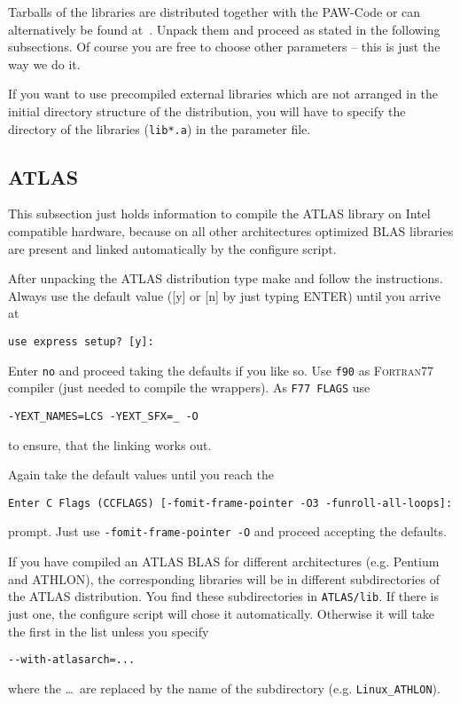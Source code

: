 \documentclass[a4paper,10pt]{article}
\newcommand{\PAW}{\textsc{PAW}}
\begin{document}
Tarballs of the libraries are distributed together with
the \PAW-Code or can alternatively be found at~\cite{mpich,atlas,fftw}.
Unpack them and proceed as stated in the following subsections.  Of course
you are free to choose other parameters -- this is just the way we do it.

If you want to use precompiled external libraries which are not arranged in the
initial directory structure of the distribution, you will have to specify the
directory of the libraries (\texttt{lib*.a}) in the parameter file.

\subsection{ATLAS}

This subsection just holds information to compile the ATLAS library on Intel
compatible hardware, because on all other architectures optimized BLAS
libraries are present and linked automatically by the configure script.

After unpacking the ATLAS distribution type make and follow the
instructions. Always use the default value ([y] or [n] by just typing ENTER) until you arrive at
\begin{verbatim}
use express setup? [y]:
\end{verbatim}
Enter \texttt{no} and proceed taking the defaults if you like so.  
Use \texttt{f90} as  \textsc{Fortran77} compiler (just needed to compile the wrappers). As \texttt{F77 FLAGS} use
\begin{verbatim}
-YEXT_NAMES=LCS -YEXT_SFX=_ -O
\end{verbatim}
to ensure, that the linking works out.

Again take the default values until you reach the 
\begin{verbatim}
Enter C Flags (CCFLAGS) [-fomit-frame-pointer -O3 -funroll-all-loops]: 
\end{verbatim}
prompt.  Just use \texttt{-fomit-frame-pointer -O} and proceed accepting the defaults.

If you have compiled an ATLAS BLAS for different architectures (e.g. Pentium
and ATHLON), the corresponding libraries will be in different
subdirectories of the ATLAS distribution. You find these subdirectories in
\texttt{ATLAS/lib}.  If there is just one, the configure script will chose it
automatically. Otherwise it will take the first in the list unless you specify 
\begin{verbatim}
--with-atlasarch=...
\end{verbatim}
where the \ldots\ are replaced by the name of the subdirectory (e.g. \texttt{Linux\_ATHLON}).
\end{document}
